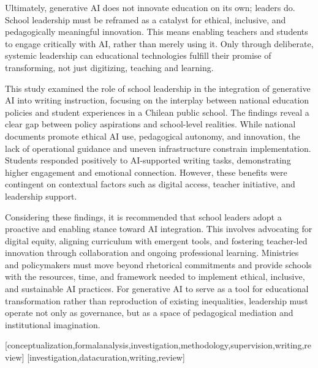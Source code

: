 \documentclass[english]{textolivre}
\begin{document}
Ultimately, generative AI does not innovate education on its own; leaders do. School leadership must be reframed as a catalyst for ethical, inclusive, and pedagogically meaningful innovation. This means enabling teachers and students to engage critically with AI, rather than merely using it. Only through deliberate, systemic leadership can educational technologies fulfill their promise of transforming, not just digitizing, teaching and learning.

This study examined the role of school leadership in the integration of generative AI into writing instruction, focusing on the interplay between national education policies and student experiences in a Chilean public school. The findings reveal a clear gap between policy aspirations and school-level realities. While national documents promote ethical AI use, pedagogical autonomy, and innovation, the lack of operational guidance and uneven infrastructure constrain implementation. Students responded positively to AI-supported writing tasks, demonstrating higher engagement and emotional connection. However, these benefits were contingent on contextual factors such as digital access, teacher initiative, and leadership support.

Considering these findings, it is recommended that school leaders adopt a proactive and enabling stance toward AI integration. This involves advocating for digital equity, aligning curriculum with emergent tools, and fostering teacher-led innovation through collaboration and ongoing professional learning. Ministries and policymakers must move beyond rhetorical commitments and provide schools with the resources, time, and framework needed to implement ethical, inclusive, and sustainable AI practices. For generative AI to serve as a tool for educational transformation rather than reproduction of existing inequalities, leadership must operate not only as governance, but as a space of pedagogical mediation and institutional imagination.


\printbibliography\label{sec-bib}


\begin{contributors}
[conceptualization,formalanalysis,investigation,methodology,supervision,writing,review]
[investigation,datacuration,writing,review]
\end{contributors}
\end{document}
